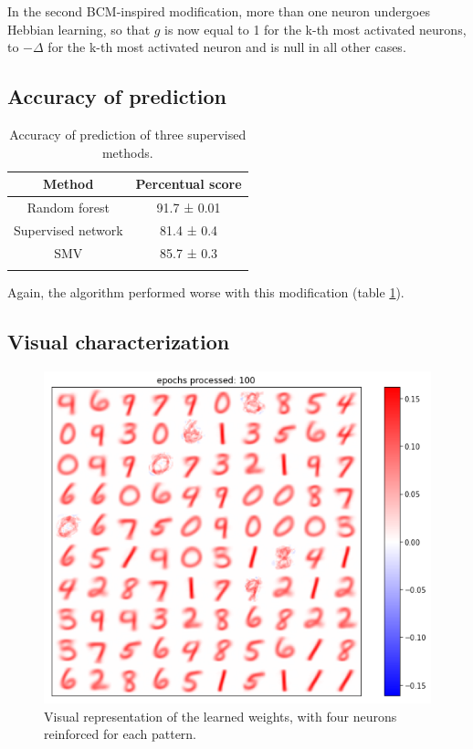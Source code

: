 \documentclass[a4paper]{report}
\begin{document}
In the second BCM-inspired modification, more than one neuron undergoes Hebbian learning, so that $g$ is now equal to 1 for the k-th most activated neurons, to $-\Delta$ for the k-th most activated neuron and is null in all other cases.

\subsection{Accuracy of prediction}

\begin{table}[hb!]
  \begin{center}
    \begin{tabular}{c|c} %
      \textbf{Method} & \textbf{Percentual score}\\
      \hline
      Random forest & 91.7  ± 0.01\\
      Supervised network & 81.4 ± 0.4\\
      SMV & 85.7 ± 0.3\\
      \label{4tab}
    \end{tabular}
    \caption{Accuracy of prediction of three supervised methods.}
  \end{center}
\end{table}

Again, the algorithm performed worse with this modification (table \ref{4tab}).

\subsection{Visual characterization}

\begin{figure} [H]
\centering
\includegraphics [width=12cm ] {h/quattrocinque.png}
\caption{Visual representation of the learned weights, with four neurons reinforced for each pattern.}
\label{multiple}
\end{figure}
\end{document}
